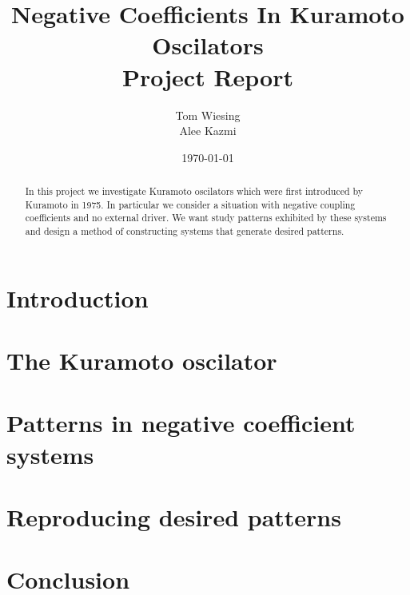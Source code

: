 \documentclass[12pt]{article}
\title{Negative Coefficients In Kuramoto Oscilators \\ Project Report}
\author{Tom Wiesing \\ Alee Kazmi}
\date{\today}
\begin{document}
	
	\maketitle
	
	
\begin{abstract}
	In this project we investigate Kuramoto oscilators which were first introduced by Kuramoto in 1975. In particular we consider a situation with negative coupling coefficients and no external driver. We want study patterns exhibited by these systems and design a method of constructing systems that generate desired patterns. 
\end{abstract}

	\newpage
	
	\tableofcontents
	\newpage
	
	\section{Introduction}
	
	\newpage
	
	\section{The Kuramoto oscilator}
	
	\newpage
	
	\section{Patterns in negative coefficient systems}
	
	\newpage
	
	\section{Reproducing desired patterns}
	
	\newpage
	
	\section{Conclusion}
	
	
	\printbibliography
\end{document}
